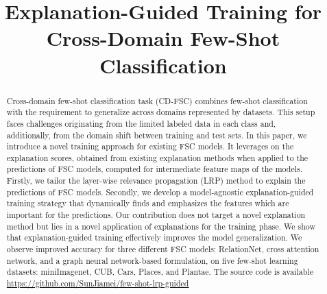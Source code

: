 \documentclass[a4paper,conference]{IEEEtran}
\begin{document}
\title{Explanation-Guided Training for Cross-Domain Few-Shot Classification}









\author{
}









\maketitle

\begin{abstract}
Cross-domain few-shot classification task (CD-FSC) combines few-shot classification with the requirement to generalize across domains represented by datasets. This setup faces challenges originating from the limited labeled data in each class and, additionally, from the domain shift between training and test sets. 
In this paper, we introduce a novel training approach for existing FSC models. It leverages on the explanation scores, obtained from existing explanation methods when applied to the predictions of FSC models, computed for intermediate feature maps of the models. Firstly, we tailor the layer-wise relevance propagation (LRP) method to explain the predictions of FSC models. Secondly, we develop a model-agnostic explanation-guided training strategy that dynamically finds and emphasizes the features which are important for the predictions. Our contribution does not target a novel explanation method but lies in a novel application of explanations for the training phase. We show that explanation-guided training effectively improves the model generalization. We observe improved accuracy for three different FSC models: RelationNet, cross attention network, and a graph neural network-based formulation, on five few-shot learning datasets: miniImagenet, CUB, Cars, Places, and Plantae. The source code is available  \url{https://github.com/SunJiamei/few-shot-lrp-guided}
\end{abstract}
\end{document}
